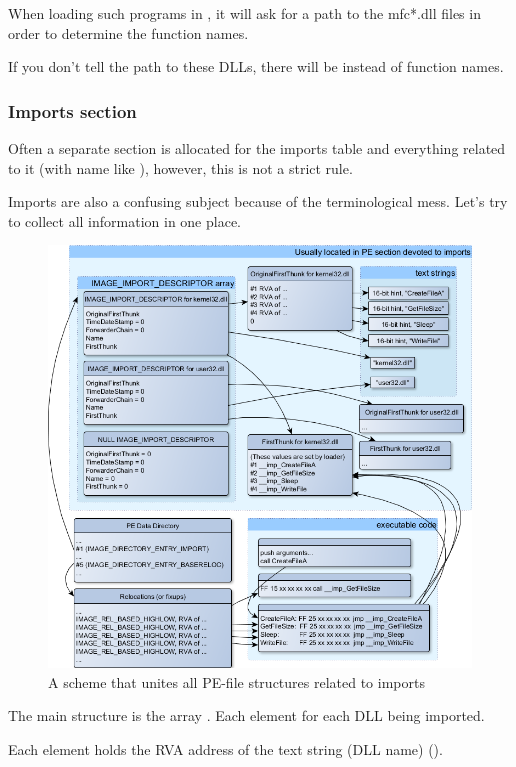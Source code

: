 When loading such programs in \IDA, it will ask for a path to the mfc*.dll files
in order to determine the function names.

If you don't tell \IDA the path to these DLLs, there will be  instead of function names.

\subsubsection{Imports section}

Often a separate section is allocated for the imports table and everything related to it (with name like ),
however, this is not a strict rule.

Imports are also a confusing subject because of the terminological mess. Let's try to collect all information in one place.

\begin{figure}[H]
\centering
\includegraphics[scale=\FigScale]{OS/PE/unnamed0.png}
\caption{
A scheme that unites all PE-file structures related to imports}
\end{figure}

The main structure is the array .
Each element for each DLL being imported.

Each element holds the \ac{RVA} address of the text string (DLL name) ().


